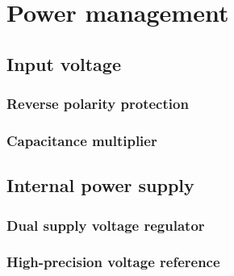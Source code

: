 \section{Power management}

\subsection{Input voltage}


\subsubsection{Reverse polarity protection}


\subsubsection{Capacitance multiplier}

\subsection{Internal power supply}

\subsubsection{Dual supply voltage regulator}

\subsubsection{High-precision voltage reference}
